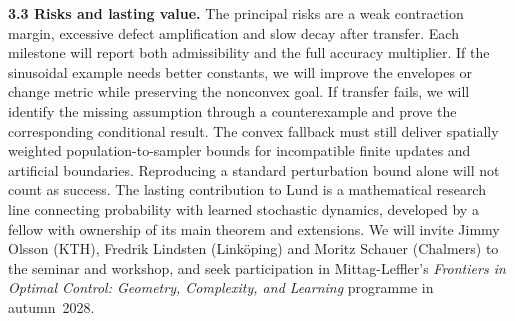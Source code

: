 \documentclass[12pt,a4paper]{article}
\begin{document}
\textbf{3.3 Risks and lasting value.}
The principal risks are a weak contraction margin, excessive defect amplification and slow decay after transfer. Each milestone will report both admissibility and the full accuracy multiplier. If the sinusoidal example needs better constants, we will improve the envelopes or change metric while preserving the nonconvex goal. If transfer fails, we will identify the missing assumption through a counterexample and prove the corresponding conditional result. The convex fallback must still deliver spatially weighted population-to-sampler bounds for incompatible finite updates and artificial boundaries. Reproducing a standard perturbation bound alone will not count as success.
The lasting contribution to Lund is a mathematical research line connecting probability with learned stochastic dynamics, developed by a fellow with ownership of its main theorem and extensions. We will invite Jimmy Olsson (KTH), Fredrik Lindsten (Link\"oping) and Moritz Schauer (Chalmers) to the seminar and workshop, and seek participation in Mittag-Leffler's \emph{Frontiers in Optimal Control: Geometry, Complexity, and Learning} programme in autumn~2028.
\begingroup
\footnotesize
\end{document}
